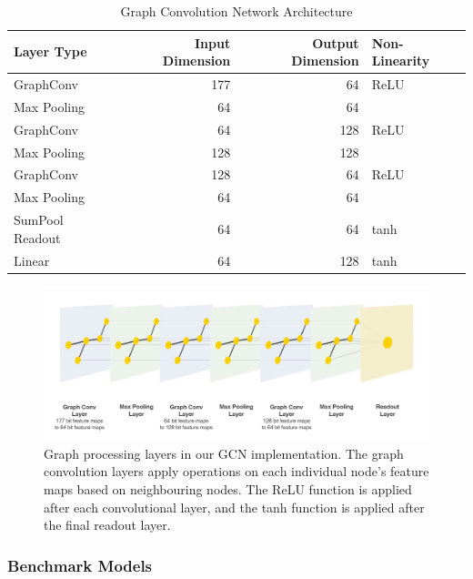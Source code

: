 \begin{table}
	\centering
	\begin{tabular}{@{}lrrl@{}}
	\hline
	\textbf{Layer Type} & \textbf{Input Dimension} & \textbf{Output Dimension} & \textbf{Non-Linearity} \\
	\hline
	GraphConv & 177 & 64 & ReLU \\
	Max Pooling & 64 & 64 & \\
	GraphConv & 64 & 128 & ReLU \\
	Max Pooling & 128 & 128 & \\
	GraphConv & 128 & 64 & ReLU \\
	Max Pooling & 64 & 64 & \\
	SumPool Readout & 64 & 64 & tanh \\
	Linear & 64 & 128 & tanh \\
	\hline	
	\end{tabular}
	\caption{Graph Convolution Network Architecture}
	\label{table:gcn-architecture}
\end{table}

\begin{figure}
	\centering
	\includegraphics[width=1\linewidth]{img/gcn-layers.png}
	\caption[Layers for graph processing in our GCN.]{Graph processing layers in our GCN implementation. The graph convolution layers apply operations on each individual node's feature maps based on neighbouring nodes. The ReLU function is applied after each convolutional layer, and the tanh function is applied after the final readout layer.}
	\label{fig:dvgcnarchi2}
\end{figure}

\subsubsection{Benchmark Models}

